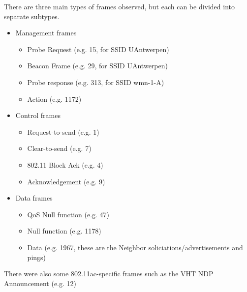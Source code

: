 There are three main types of frames observed, but each can be divided into separate subtypes.
\begin{itemize}
\item Management frames
\begin{itemize}

\item Probe Request (e.g. 15, for SSID UAntwerpen)
\item Beacon Frame (e.g. 29, for SSID UAntwerpen)

\item Probe response (e.g. 313, for SSID wmn-1-A)
\item Action (e.g. 1172)
\end{itemize}

\item Control frames
\begin{itemize}
\item Request-to-send (e.g. 1)
\item Clear-to-send (e.g. 7)
\item 802.11 Block Ack (e.g. 4)
\item Acknowledgement (e.g. 9)
\end{itemize}
\item Data frames
\begin{itemize}
\item QoS Null function (e.g. 47)
\item Null function (e.g. 1178)
\item Data (e.g. 1967, these are the Neighbor soliciations/advertisements and pings)
\end{itemize}
\end{itemize}
There were also some 802.11ac-specific frames such as the VHT NDP Announcement (e.g. 12)
